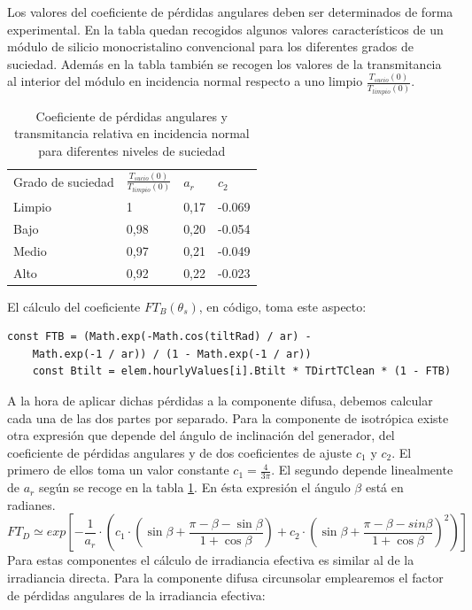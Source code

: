 Los valores del coeficiente de pérdidas angulares deben ser determinados de forma experimental. En la tabla quedan recogidos algunos valores característicos de un módulo de silicio monocristalino convencional para los diferentes grados de suciedad. Además en la tabla también se recogen los valores de la transmitancia al interior del módulo en incidencia normal respecto a uno limpio $\frac{T_{sucio}(0)}{T_{limpio}(0)}$.

\begin{table}[ht]
\centering
\begin{tabular}{llll}
\hline
Grado de suciedad & $\frac{T_{sucio}(0)}{T_{limpio}(0)}$ & $a_r$ & $c_2$ \\
Limpio            & 1                                                          & 0,17 & -0.069 \\
Bajo              & 0,98                                                       & 0,20 & -0.054 \\
Medio             & 0,97                                                       & 0,21 & -0.049 \\
Alto              & 0,92                                                       & 0,22 & -0.023
\end{tabular}
\label{tab:perdidas_suciedad}
\caption{Coeficiente de pérdidas angulares y transmitancia relativa en incidencia normal para diferentes niveles de suciedad }
\end{table}
El cálculo del coeficiente $FT_B(\theta_s)$, en código, toma este aspecto:
\begin{lstlisting}[style=ES6, caption={Cálculo del coeficiente $FT_B(\theta_s)$}]
	const FTB = (Math.exp(-Math.cos(tiltRad) / ar) - 
	Math.exp(-1 / ar)) / (1 - Math.exp(-1 / ar))
	const Btilt = elem.hourlyValues[i].Btilt * TDirtTClean * (1 - FTB)
\end{lstlisting}

A la hora de aplicar dichas pérdidas a la componente difusa, debemos calcular cada una de las dos partes por separado. Para la componente de isotrópica existe otra expresión que depende del ángulo de inclinación del generador, del coeficiente de pérdidas angulares y de dos coeficientes de ajuste $c_1$ y $c_2$. El primero de ellos toma un valor constante $c_1=\frac{4}{3\pi}$. El segundo depende linealmente de $a_r$ según se recoge en la tabla \ref{tab:perdidas_suciedad}. En ésta expresión el ángulo $\beta$ está en radianes.
\begin{equation}
FT_D \simeq exp[-\frac{1}{a_r}\cdot(c_1\cdot(\sin\beta + \frac{\pi-\beta-\sin\beta}{1+\cos\beta	})+c_2\cdot(\sin\beta + \frac{\pi-\beta-sin\beta}{1+\cos\beta})^2)]
\end{equation}
\newpage
Para estas componentes el cálculo de irradiancia efectiva es similar al de la irradiancia directa. Para la componente difusa circunsolar emplearemos el factor de pérdidas angulares de la irradiancia efectiva:

